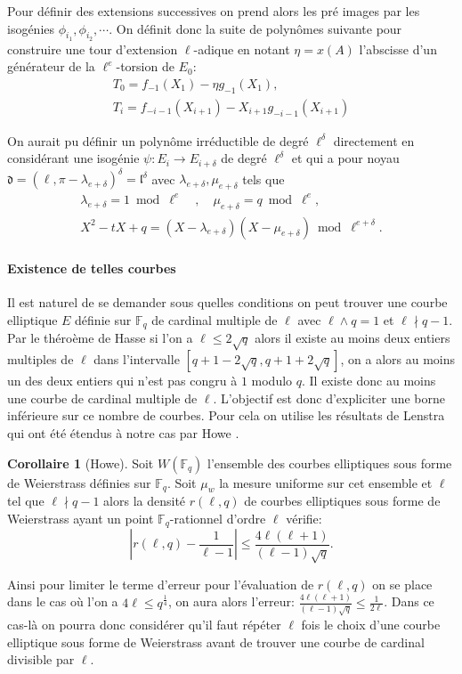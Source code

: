 \documentclass[10pt,a4paper]{book}
\theoremstyle{plain}
\theoremstyle{definition}
\theoremstyle{definition}
\newtheorem{cor}[thm]{Corollaire}
\theoremstyle{definition}
\theoremstyle{definition}
\theoremstyle{remark}
\theoremstyle{remark}
\begin{document}
Pour définir des extensions successives on prend alors les pré images par les isogénies $\phi_{i_1},\phi_{i_2}, \cdots$. On définit donc la suite de polynômes suivante pour construire une tour d'extension $\ell$-adique en notant $\eta =x(A)$ l'abscisse d'un générateur de la $\ell^e$-torsion de $E_0$:
\begin{align*}
T_0=f_{-1}(X_1)-\eta g_{-1}(X_1), \\
T_i=f_{-i-1}(X_{i+1})-X_{i+1}g_{-i-1}(X_{i+1})
\end{align*}

On aurait pu définir un polynôme irréductible de degré $\ell^{\delta}$ directement en considérant une isogénie $\psi:E_i \to E_{i+\delta}$ de degré $\ell^{\delta}$ et qui a pour noyau $\mathfrak{d}=(\ell,\pi-\lambda_{e+\delta})^{\delta}=\mathfrak{l}^{\delta}$ avec $\lambda_{e+\delta}, \mu_{e+\delta}$ tels que 
\begin{align*}
\lambda_{e+\delta}=1 \bmod \ell^{e} \quad , \quad \mu_{e+\delta}=q \bmod \ell^e, \\
X^2-tX+q = (X-\lambda_{e+\delta})(X-\mu_{e+\delta}) \bmod \ell^{e+\delta} .
\end{align*}

\paragraph{Existence de telles courbes}
Il est naturel de se demander sous quelles conditions on peut trouver une courbe elliptique $E$ définie sur $\mathbb{F}_q$ de cardinal multiple de $\ell$ avec $\ell \wedge q =1$ et $\ell \nmid q-1$. Par le théroème de Hasse si l'on a $\ell \leqslant 2\sqrt{q}$ alors il existe au moins deux entiers multiples de $\ell$ dans l'intervalle $[q+1-2\sqrt{q}, q+1+2\sqrt{q} ] $, on a alors au moins un des deux entiers qui n'est pas congru à $1$ modulo $q$. Il existe donc au moins une courbe de cardinal multiple de $\ell$. L'objectif est donc d'expliciter une borne inférieure sur ce nombre de courbes. Pour cela on utilise les résultats de Lenstra \cite{lenstra1987} qui ont été étendus à notre cas par Howe \cite{howe1993}.

\begin{cor}[Howe]
\label{cor:Howe:densite}
Soit $W(\mathbb{F}_q)$ l'ensemble des courbes elliptiques sous forme de Weierstrass définies sur $\mathbb{F}_q$. Soit $\mu_w$ la mesure uniforme sur cet ensemble et $\ell$  tel que $\ell \nmid q-1$ alors la densité $r(\ell,q)$ de courbes elliptiques sous forme de Weierstrass ayant un point $\mathbb{F}_q$-rationnel d'ordre $\ell$ vérifie:
\begin{equation*}
|r(\ell,q)-\frac{1}{\ell-1}| \leqslant \frac{4\ell(\ell+1)}{(\ell-1)\sqrt{q}}.
\end{equation*}
\end{cor}
Ainsi pour limiter le terme d'erreur pour l'évaluation de $r(\ell,q)$ on se place dans le cas où l'on a $4\ell \leqslant q^{\frac{1}{4}}$, on aura alors l'erreur: $\frac{4\ell(\ell+1)}{(\ell-1)\sqrt{q}} \leqslant \frac{1}{2 \ell} $. Dans ce cas-là on pourra donc considérer qu'il faut répéter $\ell$ fois le choix d'une courbe elliptique sous forme de Weierstrass avant de trouver une courbe de cardinal divisible par $\ell$.
\end{document}

